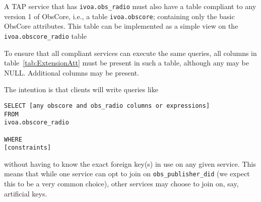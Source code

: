 \documentclass[11pt,a4paper]{ivoa}
\begin{document}
A TAP service that has \verb|ivoa.obs_radio| must also have a table
compliant to any version 1 of ObsCore, i.e., a table
\verb|ivoa.obscore|; containing only the basic ObsCore attributes.
This table can be implemented as a simple view on the \verb|ivoa.obscore_radio|
table

To ensure that all compliant services can execute the same queries,
all columns in table~\ref{tab:ExtensionAtt} must be present in such a
table, although any may be NULL. Additional columns may be present.

The intention is that clients will write queries like
\begin{lstlisting}
SELECT [any obscore and obs_radio columns or expressions]
FROM
ivoa.obscore_radio

WHERE
[constraints]
\end{lstlisting}
without having to know the exact foreign key(s) in use on any given
service.  This means that while one service can opt to join on
\verb|obs_publisher_did| (we expect this to be a very common choice),
other services may choose to join on, say, artificial keys.

%


        
\end{document}
